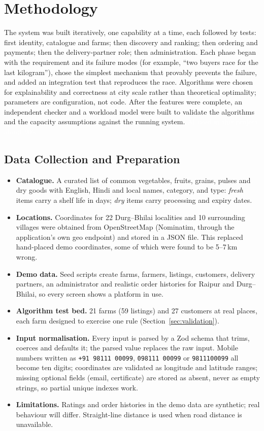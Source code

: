 \documentclass[manuscript,screen,review]{acmart}
\newcommand{\aiuse}{\textcolor{white}{AI used in this project: about 90\%.}}
\begin{document}
\section{Methodology}
\label{sec:methodology}

The system was built iteratively, one capability at a time, each followed by tests: first identity, catalogue and farms; then discovery and ranking; then ordering and payments; then the delivery-partner role; then administration. Each phase began with the requirement and its failure modes (for example, ``two buyers race for the last kilogram''), chose the simplest mechanism that provably prevents the failure, and added an integration test that reproduces the race. Algorithms were chosen for explainability and correctness at city scale rather than theoretical optimality; parameters are configuration, not code. After the features were complete, an independent checker and a workload model were built to validate the algorithms and the capacity assumptions against the running system. \aiuse

\subsection{Data Collection and Preparation}

\begin{itemize}
  \item \textbf{Catalogue.} A curated list of common vegetables, fruits, grains, pulses and dry goods with English, Hindi and local names, category, and type: \emph{fresh} items carry a shelf life in days; \emph{dry} items carry processing and expiry dates.
  \item \textbf{Locations.} Coordinates for 22 Durg--Bhilai localities and 10 surrounding villages were obtained from OpenStreetMap (Nominatim, through the application's own geo endpoint) and stored in a JSON file. This replaced hand-placed demo coordinates, some of which were found to be 5--7\,km wrong.
  \item \textbf{Demo data.} Seed scripts create farms, farmers, listings, customers, delivery partners, an administrator and realistic order histories for Raipur and Durg--Bhilai, so every screen shows a platform in use.
  \item \textbf{Algorithm test bed.} 21 farms (59 listings) and 27 customers at real places, each farm designed to exercise one rule (Section~\ref{sec:validation}).
  \item \textbf{Input normalisation.} Every input is parsed by a Zod schema that trims, coerces and defaults it; the parsed value replaces the raw input. Mobile numbers written as \texttt{+91 98111 00099}, \texttt{098111 00099} or \texttt{9811100099} all become ten digits; coordinates are validated as longitude and latitude ranges; missing optional fields (email, certificate) are stored as absent, never as empty strings, so partial unique indexes work.
  \item \textbf{Limitations.} Ratings and order histories in the demo data are synthetic; real behaviour will differ. Straight-line distance is used when road distance is unavailable.
\end{itemize}
\end{document}
